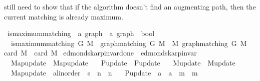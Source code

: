 \begin{isabellebody}
\begin{isamarkuptext}
still need to show that if the algorithm doesn't find an augmenting path, then the current matching
 is already maximum.%
\end{isamarkuptext}\isamarkuptrue%
\isamarkupfalse%
\ is{\isacharunderscore}{\kern0pt}maximum{\isacharunderscore}{\kern0pt}matching\ {\isacharcolon}{\kern0pt}{\isacharcolon}{\kern0pt}\ {\isachardoublequoteopen}{\isacharprime}{\kern0pt}a\ graph\ {\isasymRightarrow}\ {\isacharprime}{\kern0pt}a\ graph\ {\isasymRightarrow}\ bool{\isachardoublequoteclose}\ \isanewline
\ \ {\isachardoublequoteopen}is{\isacharunderscore}{\kern0pt}maximum{\isacharunderscore}{\kern0pt}matching\ G\ M\ {\isasymequiv}\ graph{\isacharunderscore}{\kern0pt}matching\ G\ M\ {\isasymand}\ {\isacharparenleft}{\kern0pt}{\isasymforall}M{\isacharprime}{\kern0pt}{\isachardot}{\kern0pt}\ graph{\isacharunderscore}{\kern0pt}matching\ G\ M{\isacharprime}{\kern0pt}\ {\isasymlongrightarrow}\ card\ M{\isacharprime}{\kern0pt}\ {\isasymle}\ card\ M{\isacharparenright}{\kern0pt}{\isachardoublequoteclose}\isanewline
\isanewline
{}\isamarkupfalse%
\ edmonds{\isacharunderscore}{\kern0pt}karp{\isacharunderscore}{\kern0pt}invar{\isacharunderscore}{\kern0pt}done{\isacharunderscore}{\kern0pt}{}\ {\isacharequal}{\kern0pt}\ edmonds{\isacharunderscore}{\kern0pt}karp{\isacharunderscore}{\kern0pt}invar\ \isanewline
\ \ Map{\isacharunderscore}{\kern0pt}update\ {\isacharequal}{\kern0pt}\ Map{\isacharunderscore}{\kern0pt}update\ \isanewline
\ \ P{\isacharunderscore}{\kern0pt}update\ {\isacharequal}{\kern0pt}\ P{\isacharunderscore}{\kern0pt}update\ \isanewline
\ \ M{\isacharunderscore}{\kern0pt}update\ {\isacharequal}{\kern0pt}\ M{\isacharunderscore}{\kern0pt}update\ \isanewline
\ \ Map{\isacharunderscore}{\kern0pt}update\ {\isacharcolon}{\kern0pt}{\isacharcolon}{\kern0pt}\ {\isachardoublequoteopen}{\isacharprime}{\kern0pt}a{\isacharcolon}{\kern0pt}{\isacharcolon}{\kern0pt}linorder\ {\isasymRightarrow}\ {\isacharprime}{\kern0pt}s\ {\isasymRightarrow}\ {\isacharprime}{\kern0pt}n\ {\isasymRightarrow}\ {\isacharprime}{\kern0pt}n{\isachardoublequoteclose}\ \isanewline
\ \ P{\isacharunderscore}{\kern0pt}update\ {\isacharcolon}{\kern0pt}{\isacharcolon}{\kern0pt}\ {\isachardoublequoteopen}{\isacharprime}{\kern0pt}a\ {\isasymRightarrow}\ {\isacharprime}{\kern0pt}a\ {\isasymRightarrow}\ {\isacharprime}{\kern0pt}m\ {\isasymRightarrow}\ {\isacharprime}{\kern0pt}m{\isachardoublequoteclose}\ \isanewline

\end{isabellebody}
